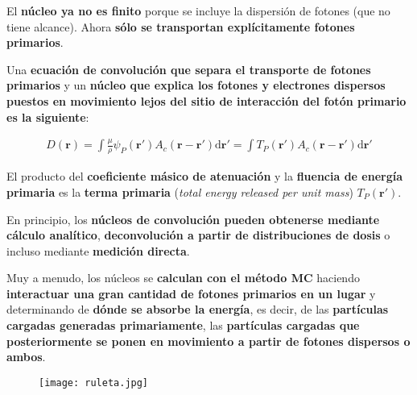 \documentclass[aspectratio=169,xcolor=dvipsnames,t]{beamer}
\newcommand{\bae}{\begin{eqnarray}}
\newcommand{\eae}{\end{eqnarray}}
\begin{document}
\begin{frame}

    \vspace{0.5cm}
    
    El \textbf{núcleo ya no es finito} porque se incluye la dispersión de fotones (que no tiene alcance). Ahora \textbf{sólo se transportan explícitamente fotones primarios}. 
    
    Una \textbf{ecuación de convolución que separa el transporte de fotones primarios} y un \textbf{núcleo que explica los fotones y electrones dispersos puestos en movimiento lejos del sitio de interacción del fotón primario es la siguiente}:
    
    \bae
    D(\mathbf{r}) = \int \frac{\mu}{\rho} \psi_P(\mathbf{r'}) A_c (\mathbf{r}-\mathbf{r'}) \text{d}\mathbf{r'} = \int T_P(\mathbf{r'}) A_c (\mathbf{r}-\mathbf{r'}) \text{d}\mathbf{r'}
    \eae

    El producto del \textbf{coeficiente másico de atenuación} y la \textbf{fluencia de energía primaria} es la \textbf{terma primaria} (\textit{total energy released per unit mass}) $T_P(\mathbf{r'})$.
    
\end{frame}

\begin{frame}

    En principio, los \textbf{núcleos de convolución pueden obtenerse mediante cálculo analítico}, \textbf{deconvolución a partir de distribuciones de dosis} o incluso mediante \textbf{medición directa}. 
    
    Muy a menudo, los núcleos se \textbf{calculan con el método MC} haciendo \textbf{interactuar una gran cantidad de fotones primarios en un lugar} y determinando de \textbf{dónde se absorbe la energía}, es decir, de las \textbf{partículas cargadas generadas primariamente}, las \textbf{partículas cargadas que posteriormente se ponen en movimiento a partir de fotones dispersos o ambos}.

    \begin{figure}
        \centering
        \texttt{[image: ruleta.jpg]}
    \end{figure}
    
\end{frame}
\end{document}
